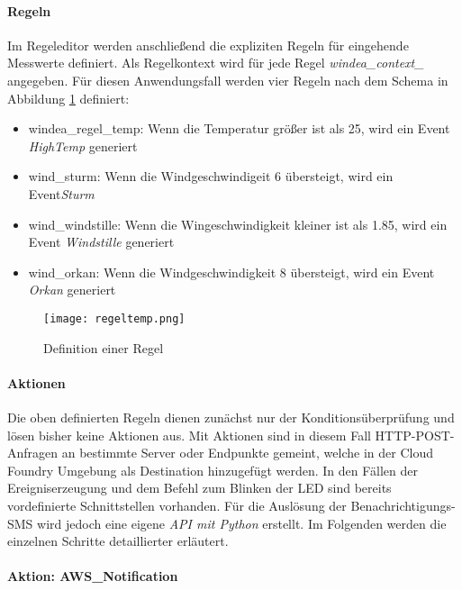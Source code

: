 \paragraph{Regeln} Im Regeleditor werden anschließend die expliziten Regeln für eingehende Messwerte definiert. Als Regelkontext wird für jede Regel \textit{windea\_context\_} angegeben. Für diesen Anwendungsfall werden vier Regeln nach dem Schema in Abbildung \ref{rules} definiert:
\begin{itemize}
  \item windea\_regel\_temp: Wenn die Temperatur größer ist als 25, wird ein Event \textit{HighTemp} generiert
  \item wind\_sturm: Wenn die Windgeschwindigeit 6 übersteigt, wird ein Event\textit{Sturm}
  \item wind\_windstille: Wenn die Wingeschwindigkeit kleiner ist als 1.85, wird ein Event \textit{Windstille} generiert
  \item wind\_orkan: Wenn die Windgeschwindigkeit 8 übersteigt, wird ein Event \textit{Orkan} generiert
\end{itemize}

\begin{figure} [H]
  \centering
  \texttt{[image: regeltemp.png]}
  \caption{Definition einer Regel}
  \label{rules}
\end{figure}

\paragraph{Aktionen}

Die oben definierten Regeln dienen zunächst nur der Konditionsüberprüfung und lösen bisher keine Aktionen aus. Mit Aktionen sind in diesem Fall HTTP-POST-Anfragen an bestimmte Server oder Endpunkte gemeint, welche in der Cloud Foundry Umgebung als Destination hinzugefügt werden. In den Fällen der Ereigniserzeugung und dem Befehl zum Blinken der LED sind bereits vordefinierte Schnittstellen vorhanden. Für die Auslösung der Benachrichtigungs-SMS wird jedoch eine eigene \textit{API mit Python} erstellt. Im Folgenden werden die einzelnen Schritte detaillierter erläutert.

\paragraph{Aktion: AWS\_Notification}

